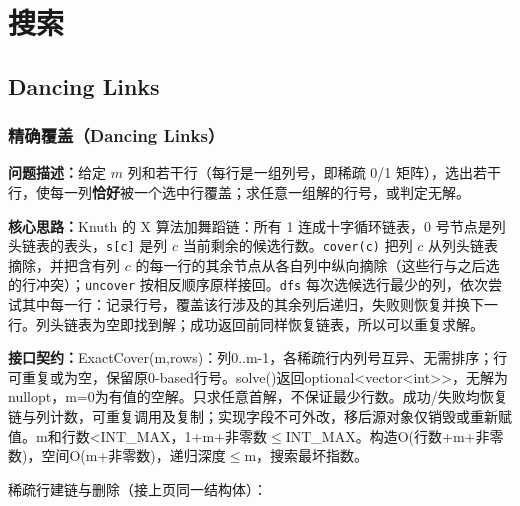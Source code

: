 \part{搜索}

\newpage

\Needspace{498pt}

\chapter{Dancing Links}

\section{精确覆盖（Dancing Links）}\label{compact-ExactCover}

\noindent\textbf{问题描述：}\allowbreak 给定 $m$ 列和若干行（每行是一组列号，即稀疏 0/1 矩阵），选出若干行，使每一列\textbf{恰好}被一个选中行覆盖；求任意一组解的行号，或判定无解。

\textbf{核心思路：}\allowbreak Knuth 的 X 算法加舞蹈链：所有 1 连成十字循环链表，0 号节点是列头链表的表头，\texttt{s[c]} 是列 $c$ 当前剩余的候选行数。\texttt{cover(c)} 把列 $c$ 从列头链表摘除，并把含有列 $c$ 的每一行的其余节点从各自列中纵向摘除（这些行与之后选的行冲突）；\texttt{uncover} 按相反顺序原样接回。\texttt{dfs} 每次选候选行最少的列，依次尝试其中每一行：记录行号，覆盖该行涉及的其余列后递归，失败则恢复并换下一行。列头链表为空即找到解；成功返回前同样恢复链表，所以可以重复求解。



{\sloppy{}\noindent\textbf{接口契约：}ExactCover(m,rows)：列0..m-1，各稀疏行内列号互异、无需排序；行可重复或为空，保留原0-based行号。solve()返回optional<vector<int>>，无解为nullopt，m=0为有值的空解。只求任意首解，不保证最少行数。成功/失败均恢复链与列计数，可重复调用及复制；实现字段不可外改，移后源对象仅销毁或重新赋值。m和行数<INT\_MAX，1+m+非零数$\le$INT\_MAX。构造O(行数+m+非零数)，空间O(m+非零数)，递归深度$\le$m，搜索最坏指数。\par}

\Needspace{294pt}



\newpage

\noindent 稀疏行建链与删除（接上页同一结构体）：



